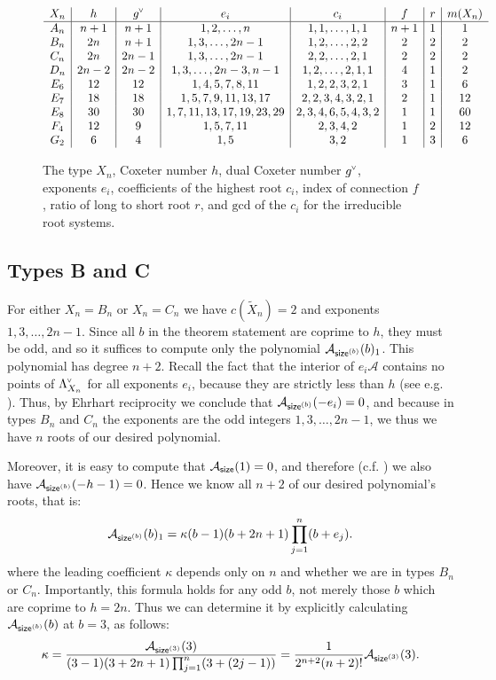 \documentclass[ALCO,published]{cedram}
\newcommand{\chk}[1]{#1^{\normalfont\smash{\scalebox{.5}[.5]{\rotatebox{90}{\textbf{\textless}}}}}}
\newcommand{\ac}{\mathcal{A}}
\newcommand{\cwl}{\chk{\Lambda}}
\newcommand{\size}{{\sf size}}
\newcommand{\sizeb}{\size^{(b)}}
\begin{document}
\begin{figure}[htbp]
\[\begin{array}{c|c|c|c|c|c|c|c}
X_n & h & \chk{g} & e_i & c_i & f & r & m(X_n) \\ \hline
A_n & n+1 & n+1 & 1,2,\ldots,n & 1,1,\ldots,1,1 & n+1 & 1 & 1 \\
B_n & 2n & n+1 & 1,3,\ldots,2n-1 & 1,2,\ldots,2,2 & 2 & 2 & 2\\
C_n & 2n & 2n-1 & 1,3,\ldots,2n-1 & 2,2,\ldots,2,1 & 2 & 2 & 2\\
D_n & 2n-2 & 2n-2 & 1,3,\ldots,2n-3,n-1 & 1,2,\ldots,2,1,1 & 4 & 1 & 2 \\
E_6 & 12 & 12 & 1, 4, 5, 7, 8, 11 & 1, 2, 2, 3, 2, 1 & 3 & 1 & 6 \\
E_7 & 18 & 18 & 1, 5, 7, 9, 11, 13, 17 & 2, 2, 3, 4, 3, 2, 1 & 2 & 1 & 12 \\
E_8 & 30 & 30 & 1, 7, 11, 13, 17, 19, 23, 29 & 2, 3, 4, 6, 5, 4, 3, 2 & 1 & 1 & 60 \\
F_4 & 12 & 9 & 1,5,7,11 & 2, 3, 4, 2 & 1 & 2 & 12 \\
G_2 & 6 & 4 & 1,5 & 3,2 & 1 & 3 & 6 \\
\end{array}\]
\caption{The type $X_n$, Coxeter number $h$, dual Coxeter number $\protect\chk{g}$, exponents $e_i$, coefficients of the highest root $c_i$, index of connection $f$, ratio of long to short root $r$, and $\mathrm{gcd}$ of the $c_i$ for the irreducible root systems.}
\label{fig:data}
\end{figure}


\subsection{Types B and C}

For either $X_n=B_n$ or $X_n=C_n$ we have $c(\widetilde{X}_n)=2$ and exponents $1,3,\ldots,2n-1$. Since all $b$ in the theorem statement are coprime to $h$, they must be odd, and so it suffices to compute only the polynomial $\ac_{\sizeb}(b)_1$. This polynomial has degree $n+2$. Recall the fact that the interior of $e_i\ac$ contains no points of $\cwl_{X_n}$ for all exponents $e_i$, because they are strictly less than $h$ (see e.g. \cite[Section 7.4]{thiel2017strange}). 
Thus, by Ehrhart reciprocity we conclude that $\ac_{\sizeb}(-e_i)=0$, and because in types $B_n$ and $C_n$ the exponents are the odd integers $1,3,\dots, 2n-1$, we thus we have $n$ roots of our desired polynomial. 

Moreover, it is easy to compute that $\ac_{\size}(1)=0$, and therefore (c.f. \cite[Proposition 7.5]{thiel2017strange}) we also have $\ac_{\sizeb}(-h-1)=0$. Hence we know all $n+2$ of our desired polynomial's roots, that is:
$$\ac_{\sizeb}(b)_1 = \kappa(b-1)(b+2n+1)\prod_{j=1}^{n} (b+e_j).$$
where the leading coefficient $\kappa$ depends only on $n$ and whether we are in types $B_n$ or $C_n$. Importantly, this formula holds for any odd $b$, not merely those $b$ which are coprime to $h=2n$. Thus we can determine it by explicitly calculating $\ac_{\sizeb}(b)$ at $b=3$, as follows:
\[ 
\kappa = \frac{\ac_{\size^{(3)}}(3)}{(3-1)(3+2n+1)\prod_{j=1}^{n} (3+(2j-1))} = \frac{1}{2^{n+2}(n+2)!}\ac_{\size^{(3)}}(3).
\]
\end{document}
